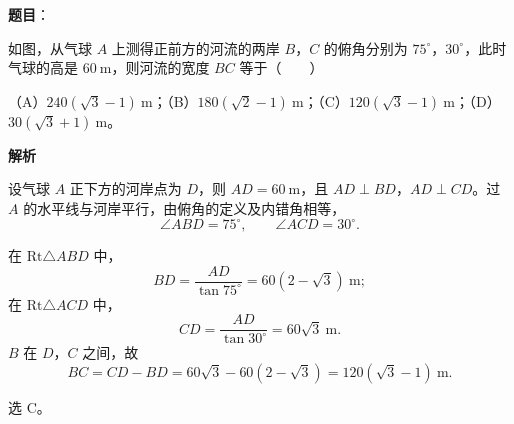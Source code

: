 \begin{answer}

\textbf{题目}：

如图，从气球 $A$ 上测得正前方的河流的两岸 $B$，$C$ 的俯角分别为 $75^\circ$，$30^\circ$，此时气球的高是 $60\ \mathrm m$，则河流的宽度 $BC$ 等于\mbox{（　　）}

（A）$240(\sqrt3-1)\ \mathrm m$；（B）$180(\sqrt2-1)\ \mathrm m$；（C）$120(\sqrt3-1)\ \mathrm m$；（D）$30(\sqrt3+1)\ \mathrm m$。
\nopagebreak[4]
\begin{center}\end{center}
\nopagebreak[4]
\textbf{解析}

设气球 $A$ 正下方的河岸点为 $D$，则 $AD=60\ \mathrm m$，且 $AD\perp BD$，$AD\perp CD$。过 $A$ 的水平线与河岸平行，由俯角的定义及内错角相等，
\nopagebreak[4]
\[\angle ABD=75^\circ,\qquad \angle ACD=30^\circ .\]

在 $\mathrm{Rt}\triangle ABD$ 中，
\nopagebreak[4]
\[BD=\frac{AD}{\tan75^\circ}=60(2-\sqrt3)\ \mathrm m ;\]
在 $\mathrm{Rt}\triangle ACD$ 中，
\nopagebreak[4]
\[CD=\frac{AD}{\tan30^\circ}=60\sqrt3\ \mathrm m .\]
$B$ 在 $D$，$C$ 之间，故
\nopagebreak[4]
\[BC=CD-BD=60\sqrt3-60(2-\sqrt3)=120(\sqrt3-1)\ \mathrm m .\]

选 C。


\end{answer}
